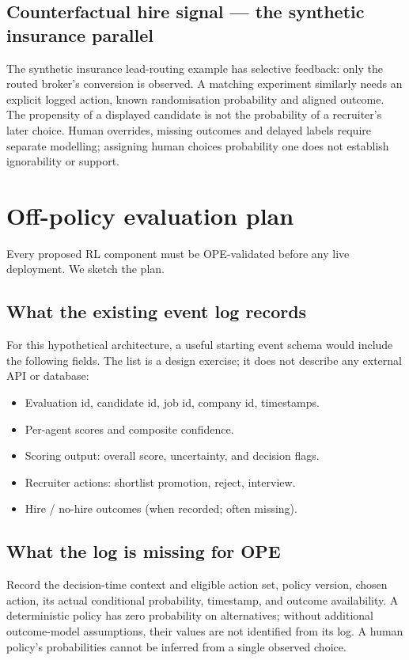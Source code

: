 \documentclass[11pt,oneside]{scrbook}
\begin{document}
\section{Counterfactual hire signal --- the synthetic insurance parallel}

The synthetic insurance lead-routing example has selective feedback: only
the routed broker's conversion is observed. A matching experiment similarly
needs an explicit logged action, known randomisation probability and aligned
outcome. The propensity of a displayed candidate is not the probability of
a recruiter's later choice. Human overrides, missing outcomes and delayed
labels require separate modelling; assigning human choices probability one
does not establish ignorability or support.

\chapter{Off-policy evaluation plan}

Every proposed RL component must be OPE-validated before any live
deployment. We sketch the plan.

\section{What the existing event log records}

For this hypothetical architecture, a useful starting event schema would
include the following fields. The list is a design exercise; it does not
describe any external API or database:

\begin{itemize}
  \item Evaluation id, candidate id, job id, company id, timestamps.
  \item Per-agent scores and composite confidence.
  \item Scoring output: overall score, uncertainty, and decision flags.
  \item Recruiter actions: shortlist promotion, reject, interview.
  \item Hire / no-hire outcomes (when recorded; often missing).
\end{itemize}

\section{What the log is missing for OPE}
Record the decision-time context and eligible action set, policy version,
chosen action, its actual conditional probability, timestamp, and outcome
availability. A deterministic policy has zero probability on alternatives;
without additional outcome-model assumptions, their values are not
identified from its log. A human policy's probabilities cannot be inferred
from a single observed choice.
\end{document}

